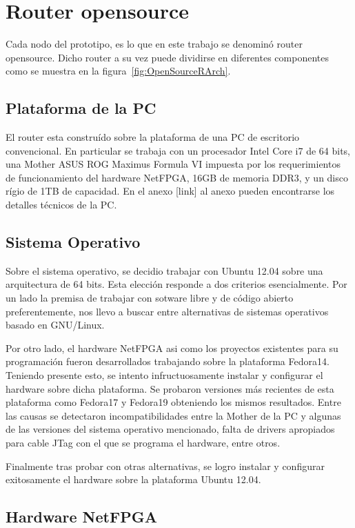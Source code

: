 \section{Router opensource}

Cada nodo del prototipo, es lo que en este trabajo se denomin\'o router opensource. Dicho router a su vez puede dividirse en diferentes componentes como se muestra en la figura~\ref{fig:OpenSourceRArch}.

\subsection{Plataforma de la PC}
El router esta constru\'ido sobre la plataforma de una PC de escritorio convencional. En particular se trabaja con un procesador Intel Core i7 de 64 bits, una Mother ASUS ROG Maximus Formula VI impuesta por los requerimientos de funcionamiento del hardware NetFPGA, 16GB de memoria DDR3, y un disco r\'igio de 1TB de capacidad. En el anexo [link] al anexo pueden encontrarse los detalles t\'ecnicos de la PC.

\subsection{Sistema Operativo}
Sobre el sistema operativo, se decidio trabajar con Ubuntu 12.04 sobre una arquitectura de 64 bits. Esta elecci\'on responde a dos criterios esencialmente. Por un lado la premisa de trabajar con sotware libre y de c\'odigo abierto preferentemente, nos llevo a buscar entre alternativas de sistemas operativos basado en GNU/Linux.

Por otro lado, el hardware NetFPGA asi como los proyectos existentes para su programaci\'on fueron desarrollados trabajando sobre la plataforma Fedora14. Teniendo presente esto, se intento infructuosamente instalar y configurar el hardware sobre dicha plataforma. Se probaron versiones m\'as recientes de esta plataforma como Fedora17 y Fedora19 obteniendo los mismos resultados. Entre las causas se detectaron incompatibilidades entre la Mother de la PC y algunas de las versiones del sistema operativo mencionado, falta de drivers apropiados para cable JTag con el que se programa el hardware, entre otros.

Finalmente tras probar con otras alternativas, se logro instalar y configurar exitosamente el hardware sobre la plataforma Ubuntu 12.04.\\

\subsection{Hardware NetFPGA}

